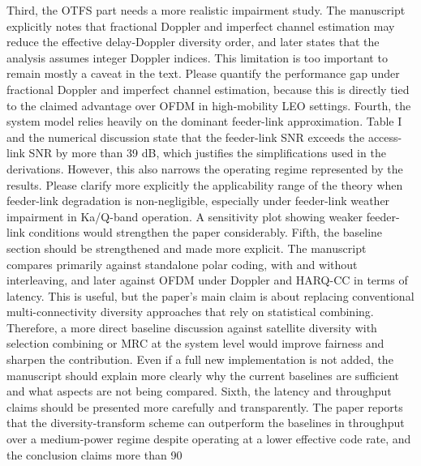 Third, the OTFS part needs a more realistic impairment study. The manuscript explicitly notes that fractional Doppler and imperfect channel estimation may reduce the effective delay-Doppler diversity order, and later states that the analysis assumes integer Doppler indices. This limitation is too important to remain mostly a caveat in the text. Please quantify the performance gap under fractional Doppler and imperfect channel estimation, because this is directly tied to the claimed advantage over OFDM in high-mobility LEO settings.
Fourth, the system model relies heavily on the dominant feeder-link approximation. Table I and the numerical discussion state that the feeder-link SNR exceeds the access-link SNR by more than 39 dB, which justifies the simplifications used in the derivations. However, this also narrows the operating regime represented by the results. Please clarify more explicitly the applicability range of the theory when feeder-link degradation is non-negligible, especially under feeder-link weather impairment in Ka/Q-band operation. A sensitivity plot showing weaker feeder-link conditions would strengthen the paper considerably.
Fifth, the baseline section should be strengthened and made more explicit. The manuscript compares primarily against standalone polar coding, with and without interleaving, and later against OFDM under Doppler and HARQ-CC in terms of latency. This is useful, but the paper’s main claim is about replacing conventional multi-connectivity diversity approaches that rely on statistical combining. Therefore, a more direct baseline discussion against satellite diversity with selection combining or MRC at the system level would improve fairness and sharpen the contribution. Even if a full new implementation is not added, the manuscript should explain more clearly why the current baselines are sufficient and what aspects are not being compared.
Sixth, the latency and throughput claims should be presented more carefully and transparently. The paper reports that the diversity-transform scheme can outperform the baselines in throughput over a medium-power regime despite operating at a lower effective code rate, and the conclusion claims more than 90%
